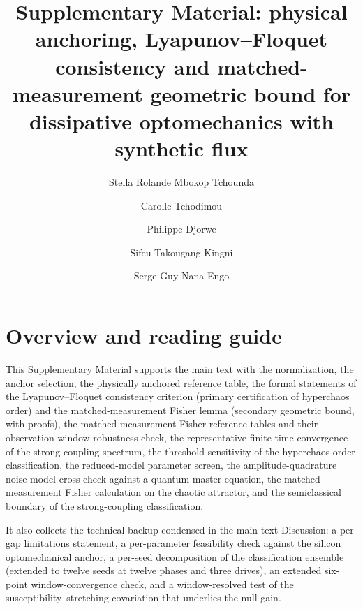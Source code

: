 \documentclass[preprint,numbers,a4paper]{elsarticle}
\begin{document}
\begin{frontmatter}

\title{Supplementary Material: physical anchoring, Lyapunov--Floquet consistency and matched-measurement geometric bound for dissipative optomechanics with synthetic flux}

\author[inst1]{Stella Rolande Mbokop Tchounda}
\author[inst1]{Carolle Tchodimou}
\author[inst2]{Philippe Djorwe}
\author[inst3]{Sifeu Takougang Kingni}
\author[inst1,corref]{Serge Guy Nana Engo}



\end{frontmatter}

\section{Overview and reading guide}

This Supplementary Material supports the main text with the normalization, the anchor selection, the physically anchored reference table, the formal statements of the Lyapunov--Floquet consistency criterion (primary certification of hyperchaos order) and the matched-measurement Fisher lemma (secondary geometric bound, with proofs), the matched measurement-Fisher reference tables and their observation-window robustness check, the representative finite-time convergence of the strong-coupling spectrum, the threshold sensitivity of the hyperchaos-order classification, the reduced-model parameter screen, the amplitude-quadrature noise-model cross-check against a quantum master equation, the matched measurement Fisher calculation on the chaotic attractor, and the semiclassical boundary of the strong-coupling classification.

It also collects the technical backup condensed in the main-text Discussion: a per-gap limitations statement, a per-parameter feasibility check against the silicon optomechanical anchor, a per-seed decomposition of the classification ensemble (extended to twelve seeds at twelve phases and three drives), an extended six-point window-convergence check, and a window-resolved test of the susceptibility--stretching covariation that underlies the null gain.
\end{document}
